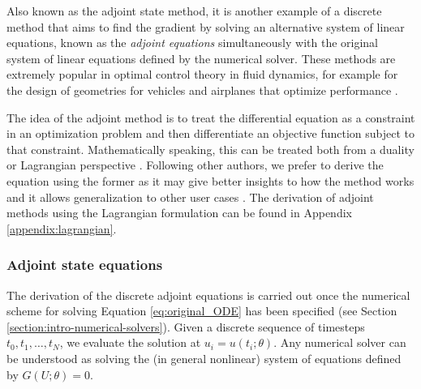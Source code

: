 Also known as the adjoint state method, it is another example of a discrete method that aims to find the gradient by solving an alternative system of linear equations, known as the \textit{adjoint equations} simultaneously with the original system of linear equations defined by the numerical solver. 
These methods are extremely popular in optimal control theory in fluid dynamics, for example for the design of geometries for vehicles and airplanes that optimize performance \cite{Elliott_Peraire_1996, Giles_Pierce_2000}.

The idea of the adjoint method is to treat the differential equation as a constraint in an optimization problem and then differentiate an objective function subject to that constraint. 
Mathematically speaking, this can be treated both from a duality or Lagrangian perspective \cite{Giles_Pierce_2000}.
Following other authors, we prefer to derive the equation using the former as it may give better insights to how the method works and it allows generalization to other user cases \cite{Givoli_2021}. 
The derivation of adjoint methods using the Lagrangian formulation can be found in Appendix \ref{appendix:lagrangian}.

\subsubsection{Adjoint state equations}


The derivation of the discrete adjoint equations is carried out once the numerical scheme for solving Equation \eqref{eq:original_ODE} has been specified (see Section \ref{section:intro-numerical-solvers}).  
Given a discrete sequence of timesteps $t_0, t_1, \ldots, t_N$, we evaluate the solution at $u_i = u(t_i; \theta)$. 
Any numerical solver can be understood as solving the (in general nonlinear) system of equations defined by $G(U; \theta) = 0$.

